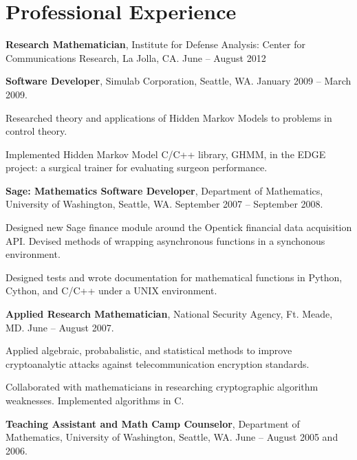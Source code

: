 \documentclass{article}
\begin{document}
\section*{Professional Experience}

\begin{itemize*}
  \item {\bf Research Mathematician}, Institute for Defense Analysis:
    Center for Communications Research, La Jolla, CA. June -- August
    2012
  \item {\bf Software Developer}, Simulab Corporation, Seattle,
    WA. January 2009 -- March 2009.
    \begin{itemize*}
      \item Researched theory and applications of Hidden Markov Models
        to problems in control theory.
      \item Implemented Hidden Markov Model C/C++ library, GHMM, in the
        EDGE project: a surgical trainer for evaluating surgeon
        performance.
    \end{itemize*}
  \item {\bf Sage: Mathematics Software Developer}, Department of
    Mathematics, University of Washington, Seattle, WA. September 2007
    -- September 2008.
    \begin{itemize*}
      \item Designed new Sage finance module around the Opentick
        financial data acquisition API. Devised methods of wrapping
        asynchronous functions in a synchonous environment.
      \item Designed tests and wrote documentation for mathematical
        functions in Python, Cython, and C/C++ under a UNIX environment.
    \end{itemize*}
  \item {\bf Applied Research Mathematician}, National Security Agency,
    Ft. Meade, MD. June -- August 2007.
    \begin{itemize*}
      \item Applied algebraic, probabalistic, and statistical methods to
        improve cryptoanalytic attacks against telecommunication
        encryption standards.
      \item Collaborated with mathematicians in researching
        cryptographic algorithm weaknesses. Implemented algorithms in C.
    \end{itemize*}
  \item {\bf Teaching Assistant and Math Camp Counselor}, Department of
    Mathematics, University of Washington, Seattle, WA. June -- August
    2005 and 2006.
\end{itemize*}
\end{document}
